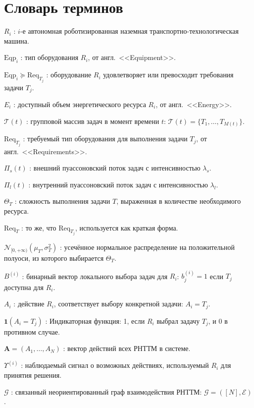 \chapter*{Словарь терминов}             %

$R_i$ : $i$-е автономная роботизированная наземная транспортно-технологическая машина.

$\text{Eqp}_i$ : тип оборудования $R_i$, от англ.\ <<Equipment>>.

$\text{Eqp}_i \succeq \text{Req}_{T_j}$ : оборудование $R_i$ удовлетворяет или превосходит требования задачи $T_j$.

$E_i$ : доступный объем энергетического ресурса $R_i$, от англ.\ <<Energy>>.

$\mathcal{T}(t)$ : групповой массив задач в момент времени $t$: $\mathcal{T}(t) = \{ T_1, \dotsc, T_{M(t)} \}$.

$\text{Req}_{T_j}$ : требуемый тип оборудования для выполнения задачи $T_j$, от англ.\ <<Requirements>>.

$\Pi_s(t)$ : внешний пуассоновский поток задач с интенсивностью $\lambda_s$.

$\Pi_l(t)$ : внутренний пуассоновский поток задач с интенсивностью $\lambda_l$.

$\Theta_T$ : сложность выполнения задачи $T$, выраженная в количестве необходимого ресурса.

$\text{Req}_T$ : то же, что $\text{Req}_{T_j}$, используется как краткая форма.

$\mathcal{N}_{[0, +\infty)}(\mu_T, \sigma_T^2)$ : усечённое нормальное распределение на положительной полуоси, из которого выбирается $\Theta_T$.

$B^{(i)}$ : бинарный вектор локального выбора задач для $R_i$: $b_j^{(i)} = 1$ если $T_j$ доступна для $R_i$.

$A_i$ : действие $R_i$, соответствует выбору конкретной задачи: $A_i = T_j$.

$\mathbf{1}(A_i = T_j)$ : Индикаторная функция: 1, если $R_i$ выбрал задачу $T_j$, и 0 в противном случае.

$\mathbf{A} = (A_1,\dots,A_N)$ : вектор действий всех РНТТМ в системе.

$\Upsilon^{(i)}$ : наблюдаемый сигнал о возможных действиях, используемый $R_i$ для принятия решения.

$\mathcal{G}$ : связанный неориентированный граф взаимодействия РНТТМ: $\mathcal{G} = ([N], \mathcal{E})$.

